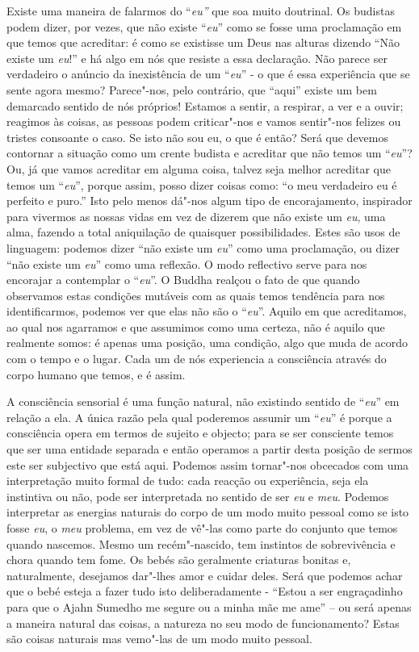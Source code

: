 Existe uma maneira de falarmos do ``\emph{eu''} que soa muito doutrinal.
Os budistas podem dizer, por vezes, que não existe ``\emph{eu}'' como se
fosse uma proclamação em que temos que acreditar: é como se existisse um
Deus nas alturas dizendo ``Não existe um \emph{eu}!'' e há algo em nós
que resiste a essa declaração. Não parece ser verdadeiro o anúncio da
inexistência de um ``\emph{eu}'' - o que é essa experiência que se sente
agora mesmo? Parece"-nos, pelo contrário, que ``aqui'' existe um bem
demarcado sentido de nós próprios! Estamos a sentir, a respirar, a ver e
a ouvir; reagimos às coisas, as pessoas podem criticar"-nos e vamos
sentir"-nos felizes ou tristes consoante o caso. Se isto não sou eu, o
que é então? Será que devemos contornar a situação como um crente
budista e acreditar que não temos um ``\emph{eu}''? Ou, já que vamos
acreditar em alguma coisa, talvez seja melhor acreditar que temos um
``\emph{eu}'', porque assim, posso dizer coisas como: ``o meu verdadeiro eu
é perfeito e puro.'' Isto pelo menos dá"-nos algum tipo de encorajamento,
inspirador para vivermos as nossas vidas em vez de dizerem que não
existe um \emph{eu}, uma alma, fazendo a total aniquilação de quaisquer
possibilidades. Estes são usos de linguagem: podemos dizer ``não existe
um \emph{eu}'' como uma proclamação, ou dizer ``não existe um
\emph{eu}'' como uma reflexão. O modo reflectivo serve para nos
encorajar a contemplar o ``\emph{eu}''. O Buddha realçou o fato de que
quando observamos estas condições mutáveis com as quais temos tendência
para nos identificarmos, podemos ver que elas não são o ``\emph{eu}''.
Aquilo em que acreditamos, ao qual nos agarramos e que assumimos como
uma certeza, não é aquilo que realmente somos: é apenas uma posição, uma
condição, algo que muda de acordo com o tempo e o lugar. Cada um de nós
experiencia a consciência através do corpo humano que temos, e é assim.

A consciência sensorial é uma função natural, não existindo sentido de
``\emph{eu}'' em relação a ela. A única razão pela qual poderemos assumir um
``\emph{eu}'' é porque a consciência opera em termos de sujeito e objecto;
para se ser consciente temos que ser uma entidade separada e então
operamos a partir desta posição de sermos este ser subjectivo que está
aqui. Podemos assim tornar"-nos obcecados com uma interpretação muito
formal de tudo: cada reacção ou experiência, seja ela instintiva ou não,
pode ser interpretada no sentido de ser \emph{eu} e \emph{meu}. Podemos
interpretar as energias naturais do corpo de um modo muito pessoal como
se isto fosse \emph{eu}, o \emph{meu} problema, em vez de vê"-las como
parte do conjunto que temos quando nascemos. Mesmo um recém"-nascido, tem
instintos de sobrevivência e chora quando tem fome. Os bebés são
geralmente criaturas bonitas e, naturalmente, desejamos dar"-lhes amor e
cuidar deles. Será que podemos achar que o bebé esteja a fazer tudo isto
deliberadamente - ``Estou a ser engraçadinho para que o Ajahn Sumedho me
segure ou a minha mãe me ame'' -- ou será apenas a maneira natural das
coisas, a natureza no seu modo de funcionamento? Estas são coisas
naturais mas vemo"-las de um modo muito pessoal.

